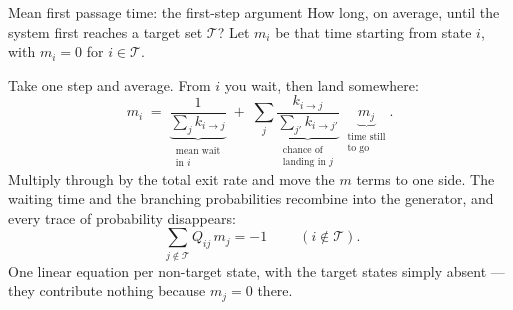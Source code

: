 \documentclass[10pt,aspectratio=169]{beamer}
\begin{document}
\begin{frame}{Mean first passage time: the first-step argument}
  How long, on average, until the system first reaches a target set
  $\mathcal{T}$? Let $m_i$ be that time starting from state $i$, with
  $m_i=0$ for $i\in\mathcal{T}$.

  Take one step and average. From $i$ you wait, then land somewhere:
  \[
    m_i \;=\;
    \underbrace{\frac{1}{\sum_j k_{i\to j}}}_{\substack{\text{mean wait}\\
      \text{in }i}}
    \;+\;
    \sum_j
    \underbrace{\frac{k_{i\to j}}{\sum_{j'} k_{i\to j'}}}_{\substack{
      \text{chance of}\\ \text{landing in }j}}
    \;\underbrace{m_j}_{\substack{\text{time still}\\ \text{to go}}} .
  \]
  Multiply through by the total exit rate and move the $m$ terms to one
  side. The waiting time and the branching probabilities recombine into the
  generator, and every trace of probability disappears:
  \[
    \boxed{\;\sum_{j\notin\mathcal{T}} Q_{ij}\, m_j = -1\;}
    \qquad (i\notin\mathcal{T}).
  \]
  One linear equation per non-target state, with the target states simply
  absent --- they contribute nothing because $m_j=0$ there.
\end{frame}
\end{document}
